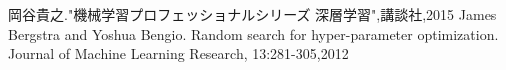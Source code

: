 

\begin{thebibliography}{99}
  岡谷貴之."機械学習プロフェッショナルシリーズ 深層学習",講談社,2015
   James Bergstra and Yoshua Bengio. Random search for hyper-parameter optimization. Journal of Machine Learning Research, 13:281-305,2012
  

\end{thebibliography}




